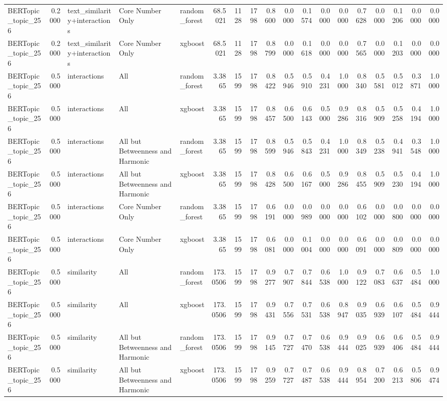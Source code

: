 \begin{tabular}{lrlllrrrrrrrrrrrrr}
BERTopic_topic_256 & 0.2000 & text_similarity+interactions & Core Number Only & random_forest & 68.5021 & 1128 & 1798 & 0.8600 & 0.0000 & 0.1574 & 0.0000 & 0.0000 & 0.7628 & 0.0000 & 0.1206 & 0.0000 & 0.0000 \\
BERTopic_topic_256 & 0.2000 & text_similarity+interactions & Core Number Only & xgboost & 68.5021 & 1128 & 1798 & 0.8799 & 0.0000 & 0.1618 & 0.0000 & 0.0000 & 0.7565 & 0.0000 & 0.1203 & 0.0000 & 0.0000 \\
BERTopic_topic_256 & 0.5000 & interactions & All & random_forest & 3.3865 & 1599 & 1798 & 0.8422 & 0.5946 & 0.5910 & 0.4231 & 1.0000 & 0.8340 & 0.5581 & 0.5012 & 0.3871 & 1.0000 \\
BERTopic_topic_256 & 0.5000 & interactions & All & xgboost & 3.3865 & 1599 & 1798 & 0.8457 & 0.6500 & 0.6143 & 0.5000 & 0.9286 & 0.8316 & 0.5909 & 0.5258 & 0.4194 & 1.0000 \\
BERTopic_topic_256 & 0.5000 & interactions & All but Betweenness and Harmonic & random_forest & 3.3865 & 1599 & 1798 & 0.8599 & 0.5946 & 0.5843 & 0.4231 & 1.0000 & 0.8349 & 0.5238 & 0.4941 & 0.3548 & 1.0000 \\
BERTopic_topic_256 & 0.5000 & interactions & All but Betweenness and Harmonic & xgboost & 3.3865 & 1599 & 1798 & 0.8428 & 0.6500 & 0.6167 & 0.5000 & 0.9286 & 0.8455 & 0.5909 & 0.5230 & 0.4194 & 1.0000 \\
BERTopic_topic_256 & 0.5000 & interactions & Core Number Only & random_forest & 3.3865 & 1599 & 1798 & 0.6191 & 0.0000 & 0.0989 & 0.0000 & 0.0000 & 0.6102 & 0.0000 & 0.0800 & 0.0000 & 0.0000 \\
BERTopic_topic_256 & 0.5000 & interactions & Core Number Only & xgboost & 3.3865 & 1599 & 1798 & 0.6081 & 0.0000 & 0.1004 & 0.0000 & 0.0000 & 0.6091 & 0.0000 & 0.0809 & 0.0000 & 0.0000 \\
BERTopic_topic_256 & 0.5000 & similarity & All & random_forest & 173.0506 & 1599 & 1798 & 0.9277 & 0.7907 & 0.7844 & 0.6538 & 1.0000 & 0.9122 & 0.7083 & 0.6637 & 0.5484 & 1.0000 \\
BERTopic_topic_256 & 0.5000 & similarity & All & xgboost & 173.0506 & 1599 & 1798 & 0.9431 & 0.7556 & 0.7531 & 0.6538 & 0.8947 & 0.9035 & 0.6939 & 0.6107 & 0.5484 & 0.9444 \\
BERTopic_topic_256 & 0.5000 & similarity & All but Betweenness and Harmonic & random_forest & 173.0506 & 1599 & 1798 & 0.9145 & 0.7727 & 0.7470 & 0.6538 & 0.9444 & 0.9025 & 0.6939 & 0.6406 & 0.5484 & 0.9444 \\
BERTopic_topic_256 & 0.5000 & similarity & All but Betweenness and Harmonic & xgboost & 173.0506 & 1599 & 1798 & 0.9259 & 0.7727 & 0.7487 & 0.6538 & 0.9444 & 0.8954 & 0.7200 & 0.6213 & 0.5806 & 0.9474 \\

\end{tabular}
